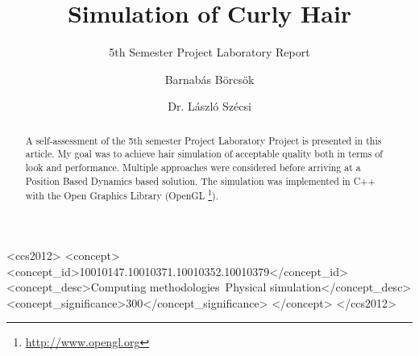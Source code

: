 \documentclass[sigplan,screen,nonacm]{acmart}
\begin{document}

\title[Hair Simulation]{Simulation of Curly Hair}
\subtitle{5th Semester Project Laboratory Report}

\author{Barnabás Börcsök}
\affiliation{%
  \institution{}%
  \city{}
  \country{}
}

\author{Dr. László Szécsi}
\affiliation{%
    \institution{}
    \city{}
    \country{}
}



\begin{abstract}
    A self-assessment of the 5th semester Project Laboratory
    Project is presented in this article. My goal was to achieve hair simulation
    of acceptable quality both in terms of look and performance. Multiple
    approaches were considered before arriving at a Position Based Dynamics
    based solution. The simulation was implemented in C++ with the Open Graphics
    Library (OpenGL \footnote{\url{http://www.opengl.org}}). 
\end{abstract}

\begin{CCSXML}
<ccs2012>
<concept>
<concept_id>10010147.10010371.10010352.10010379</concept_id>
<concept_desc>Computing methodologies~Physical simulation</concept_desc>
<concept_significance>300</concept_significance>
</concept>
</ccs2012>
\end{CCSXML}
\end{document}
